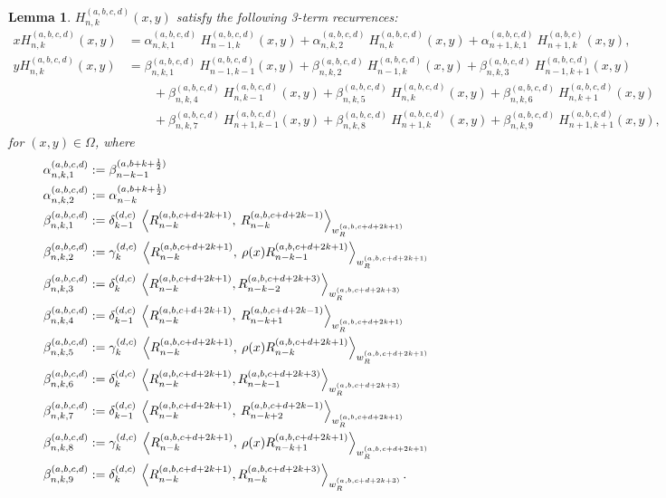 \documentclass[11pt, oneside]{article}   	%
\newcommand{\half}{\frac{1}{2}}
\newcommand{\hdop}{H}
\newcommand{\genjac}{R}
\newcommand{\genjacnmk}{\genjac_{n-k}}
\newcommand{\genjacw}{w_\genjac}
\newcommand{\alphaabcd}{\alpha^{(a,b,c,d)}}
\newcommand{\betaabcd}{\beta^{(a,b,c,d)}}
\newcommand{\hdopnkabcd}{\hdop_{n,k}^{(a,b,c,d)}}
\newtheorem{lemma}{Lemma}
\begin{document}
\begin{lemma}
$\hdopnkabcd(x,y)$ satisfy the following 3-term recurrences:
\begin{align*}
x \hdopnkabcd(x,y) &= \alphaabcd_{n,k,1} \: \hdop_{n-1, k}^{(a,b,c,d)}(x, y) + \alphaabcd_{n,k,2} \: \hdop_{n, k}^{(a,b,c,d)}(x, y) + \alphaabcd_{n+1,k,1} \: \hdop_{n+1, k}^{(a,b,c)}(x, y), \\
y \hdopnkabcd(x,y) &= \betaabcd_{n,k,1} \: \hdop_{n-1, k-1}^{(a,b,c,d)}(x, y) + \betaabcd_{n,k,2} \: \hdop_{n-1, k}^{(a,b,c,d)}(x, y) + \betaabcd_{n,k,3} \: \hdop_{n-1, k+1}^{(a,b,c,d)}(x, y) \nonumber \\
		& \quad \quad + \betaabcd_{n,k,4} \: \hdop_{n, k-1}^{(a,b,c,d)}(x, y) + \betaabcd_{n,k,5} \: \hdop_{n, k}^{(a,b,c,d)}(x, y) + \betaabcd_{n,k,6} \: \hdop_{n, k+1}^{(a,b,c,d)}(x, y) \nonumber \\
		& \quad \quad + \betaabcd_{n,k,7} \: \hdop_{n+1, k-1}^{(a,b,c,d)}(x, y) + \betaabcd_{n,k,8} \: \hdop_{n+1, k}^{(a,b,c,d)}(x, y) + \betaabcd_{n,k,9} \: \hdop_{n+1, k+1}^{(a,b,c,d)}(x, y),
\end{align*}
for \((x,y) \in \Omega\), where
\begin{align*}
	\alphaabcd_{n,k,1} &:= \beta_{n-k-1}^{(a, b+k+\half)} \\
	\alphaabcd_{n,k,2} &:= \alpha_{n-k}^{(a, b+k+\half)} \\
	\betaabcd_{n,k,1} &:= \delta_{k-1}^{(d,c)} \: \ip<\genjacnmk^{(a, b, c+d+2k+1)}, \: \genjacnmk^{(a, b, c+d+2k-1)}>_{\genjacw^{(a, b, c+d+2k+1)}} \\
	\betaabcd_{n,k,2} &:= \gamma_k^{(d,c)} \: \ip<\genjacnmk^{(a, b, c+d+2k+1)}, \: \rho(x) \genjac_{n-k-1}^{(a, b, c+d+2k+1)}>_{\genjacw^{(a, b, c+d+2k+1)}} \\
	\betaabcd_{n,k,3} &:= \delta_{k}^{(d,c)} \: \ip<\genjacnmk^{(a, b, c+d+2k+1)}, \genjac_{n-k-2}^{(a, b, c+d+2k+3)}>_{\genjacw^{(a, b, c+d+2k+3)}} \\
	\betaabcd_{n,k,4} &:= \delta_{k-1}^{(d,c)} \: \ip<\genjacnmk^{(a, b, c+d+2k+1)}, \: \genjac_{n-k+1}^{(a, b, c+d+2k-1)}>_{\genjacw^{(a, b, c+d+2k+1)}} \\
	\betaabcd_{n,k,5} &:= \gamma_k^{(d,c)} \: \ip<\genjacnmk^{(a, b, c+d+2k+1)}, \: \rho(x) \genjac_{n-k}^{(a, b, c+d+2k+1)}>_{\genjacw^{(a, b, c+d+2k+1)}} \\
	\betaabcd_{n,k,6} &:= \delta_{k}^{(d,c)} \: \ip<\genjacnmk^{(a, b, c+d+2k+1)}, \genjac_{n-k-1}^{(a, b, c+d+2k+3)}>_{\genjacw^{(a, b, c+d+2k+3)}} \\
	\betaabcd_{n,k,7} &:= \delta_{k-1}^{(d,c)} \: \ip<\genjacnmk^{(a, b, c+d+2k+1)}, \: \genjac_{n-k+2}^{(a, b, c+d+2k-1)}>_{\genjacw^{(a, b, c+d+2k+1)}} \\
	\betaabcd_{n,k,8} &:= \gamma_k^{(d,c)} \: \ip<\genjacnmk^{(a, b, c+d+2k+1)}, \: \rho(x) \genjac_{n-k+1}^{(a, b, c+d+2k+1)}>_{\genjacw^{(a, b, c+d+2k+1)}} \\
	\betaabcd_{n,k,9} &:= \delta_{k}^{(d,c)} \: \ip<\genjacnmk^{(a, b, c+d+2k+1)}, \genjacnmk^{(a, b, c+d+2k+3)}>_{\genjacw^{(a, b, c+d+2k+3)}}. 
\end{align*}

\end{lemma}
\end{document}
